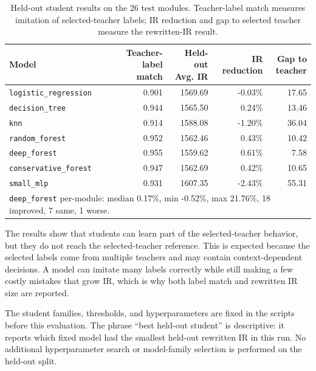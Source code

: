 \documentclass[12pt, a4paper]{report}
\begin{document}
\begin{table}[H]
\centering
{\small
\setlength{\tabcolsep}{2pt}
\begin{tabular}{|l|r|r|r|r|}
\hline
Model & \shortstack{Teacher-label\\match} & \shortstack{Held-out\\Avg. IR} &
\shortstack{IR\\reduction} & \shortstack{Gap to\\teacher} \\
\hline
\texttt{logistic\_regression} & 0.901 & 1569.69 & -0.03\% & 17.65 \\
\hline
\texttt{decision\_tree} & 0.944 & 1565.50 & 0.24\% & 13.46 \\
\hline
\texttt{knn} & 0.914 & 1588.08 & -1.20\% & 36.04 \\
\hline
\texttt{random\_forest} & 0.952 & 1562.46 & 0.43\% & 10.42 \\
\hline
\texttt{deep\_forest} & 0.955 & 1559.62 & 0.61\% & 7.58 \\
\hline
\texttt{conservative\_forest} & 0.947 & 1562.69 & 0.42\% & 10.65 \\
\hline
\texttt{small\_mlp} & 0.931 & 1607.35 & -2.43\% & 55.31 \\
\hline
\multicolumn{5}{|l|}{\footnotesize \texttt{deep\_forest} per-module:
median 0.17\%, min -0.52\%, max 21.76\%, 18 improved, 7 same, 1 worse.} \\
\hline
\end{tabular}%
}
\caption{Held-out student results on the 26 test modules. Teacher-label match
measures imitation of selected-teacher labels; IR reduction and gap to selected
teacher measure the rewritten-IR result.}
\label{tab:held-out-student-results}
\end{table}

The results show that students can learn part of the selected-teacher behavior,
but they do not reach the selected-teacher reference. This is expected because
the selected labels come from multiple teachers and may contain context-dependent
decisions. A model can imitate many labels correctly while still making a few
costly mistakes that grow IR, which is why both label match and rewritten IR
size are reported.

The student families, thresholds, and hyperparameters are fixed in the scripts
before this evaluation. The phrase ``best held-out student'' is descriptive:
it reports which fixed model had the smallest held-out rewritten IR in this
run. No additional hyperparameter search or model-family selection is performed
on the held-out split.
\end{document}
